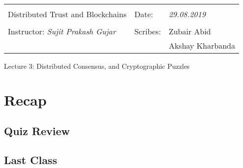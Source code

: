 \documentclass[10pt,a4paper]{article}
\begin{document}
\begin{table}[!h]
\centering
\begin{tabularx}{\textwidth}{|Xll|}
\hline
& &\\
Distributed Trust and Blockchains &  Date: & \emph{29.08.2019}\\
 & &\\
Instructor: \emph{Sujit Prakash Gujar} & Scribes: & {Zubair Abid}\\ & & {Akshay Kharbanda} \\ 
 \hline

\end{tabularx}
\end{table}

\begin{center}
\begin{LARGE}
Lecture 3: Distributed Consensus, and Cryptographic Puzzles
\end{LARGE}
\end{center}

\section{Recap}
\subsection{Quiz Review}
\subsection{Last Class}
\end{document}
